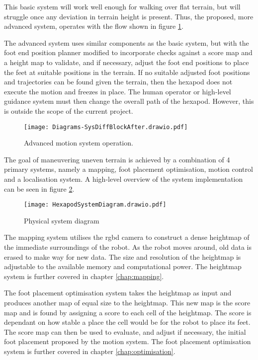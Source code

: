 \noindent
This basic system will work well enough for walking over flat terrain, but will struggle once any
deviation in terrain height is present. Thus, the proposed, more advanced system, operates with the flow shown in figure \ref{fig:adv_sys}.

The advanced system uses similar components as the basic system, but with the foot end position planner modified to incorporate
checks against a score map and a height map to validate, and if necessary, adjust the foot 
end positions to place the feet at suitable positions in the  terrain. If no suitable adjusted foot positions and trajectories
can be found given the terrain, then the hexapod does not execute the motion and freezes in place. The human operator or
high-level guidance system must then change the overall path of the hexapod. However, this is outside the scope of the current
project.

\newpage
\begin{figure}[h]
    \centering
    \texttt{[image: Diagrams-SysDiffBlockAfter.drawio.pdf]}
    \caption{Advanced motion system operation.}
    \label{fig:adv_sys}
\end{figure}

\noindent
The goal of maneuvering uneven terrain is achieved by a combination of 4 primary systems, namely a mapping, 
foot placement optimisation, motion control and a localisation system. A high-level overview of the system implementation can be seen
in figure \ref{fig:system_diagram}.
\begin{figure}[h]
    \centering
    \texttt{[image: HexapodSystemDiagram.drawio.pdf]}
    \caption{Physical system diagram}
    \label{fig:system_diagram}
\end{figure}

\noindent
The mapping system utilises the \ac*{rgbd} camera to construct a dense heightmap of the immediate surroundings of the robot. As the robot moves around, old data is erased to make way for new data. The size and resolution of the heightmap is adjustable to the available memory and computational power. The heightmap system is further covered in chapter \ref{chap:mapping}.

The foot placement optimisation system takes the heightmap as input and produces another map of equal size to the heightmap. This new map is the score map and is found by assigning a score to each cell of the heightmap. The score is dependant on how stable a place the cell would be for the robot to place its feet. The score map can then be used to evaluate, and adjust if necessary, the initial foot placement proposed by the motion system. The foot placement optimisation system is further covered in chapter \ref{chap:optimisation}.

